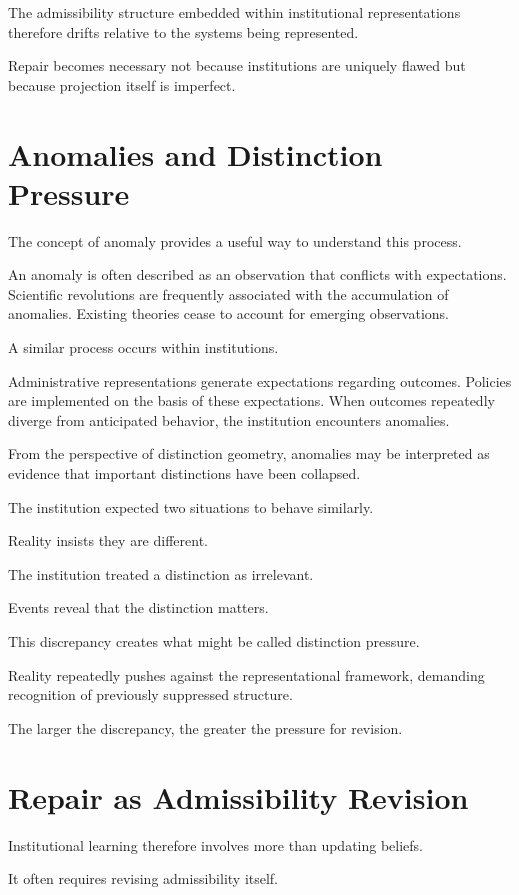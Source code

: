 \documentclass[11pt,oneside,openany]{book}
\begin{document}
The admissibility structure embedded within institutional representations therefore drifts relative to the systems being represented.

Repair becomes necessary not because institutions are uniquely flawed but because projection itself is imperfect.

\section{Anomalies and Distinction Pressure}

The concept of anomaly provides a useful way to understand this process.

An anomaly is often described as an observation that conflicts with expectations. Scientific revolutions are frequently associated with the accumulation of anomalies. Existing theories cease to account for emerging observations.

A similar process occurs within institutions.

Administrative representations generate expectations regarding outcomes. Policies are implemented on the basis of these expectations. When outcomes repeatedly diverge from anticipated behavior, the institution encounters anomalies.

From the perspective of distinction geometry, anomalies may be interpreted as evidence that important distinctions have been collapsed.

The institution expected two situations to behave similarly.

Reality insists they are different.

The institution treated a distinction as irrelevant.

Events reveal that the distinction matters.

This discrepancy creates what might be called distinction pressure.

Reality repeatedly pushes against the representational framework, demanding recognition of previously suppressed structure.

The larger the discrepancy, the greater the pressure for revision.

\section{Repair as Admissibility Revision}

Institutional learning therefore involves more than updating beliefs.

It often requires revising admissibility itself.
\end{document}
